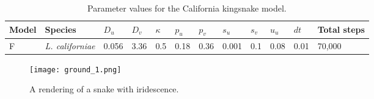 \begin{table}[h]
	\centering
	\begin{tabular}{|l|l|l|l|l|l|l|l|l|l|l|l|}
	\hline
	Model & Species &$D_u$ &$D_v$ &$\kappa$ &$p_u$ &$p_v$ &$s_u$ &$s_v$  &$u_u$ &$dt$ &Total steps\\ \hline 
	F     &\textit{L. californiae} &0.056 &3.36 &0.5 &0.18 &0.36 &0.001 &0.1 &0.08 &0.01 &70,000                \\ \hline
	\end{tabular}
	\caption {Parameter values for the California kingsnake model.}
	\label{tab:snakeParameters}
\end{table}

\begin{figure}[p]
	\centering
	\texttt{[image: ground\_1.png]}
	\caption{A rendering of a snake with iridescence.}
	\label{fig:SnakeRendering}
\end{figure}